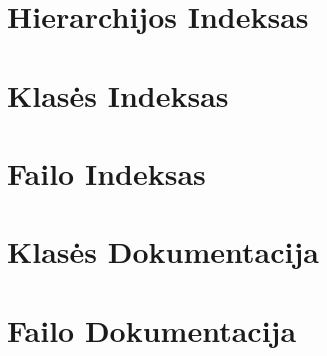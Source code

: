 \documentclass{report}
\newcommand{\+}{}
\begin{document}

\chapter{Hierarchijos Indeksas}

\chapter{Klasės Indeksas}

\chapter{Failo Indeksas}

\chapter{Klasės Dokumentacija}


\chapter{Failo Dokumentacija}





  \newpage
  \printindex
\end{document}

